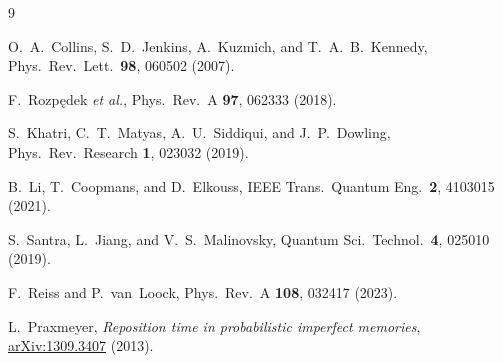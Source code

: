 \documentclass[aps,pra,twocolumn,superscriptaddress,floatfix,nofootinbib]{revtex4-2}
\begin{document}
\begin{thebibliography}{9}

  O.~A.~Collins, S.~D.~Jenkins, A.~Kuzmich, and T.~A.~B.~Kennedy,
  Phys.\ Rev.\ Lett.\ \textbf{98}, 060502 (2007).

  F.~Rozp\k{e}dek \emph{et al.},
  Phys.\ Rev.\ A \textbf{97}, 062333 (2018).

  S.~Khatri, C.~T.~Matyas, A.~U.~Siddiqui, and J.~P.~Dowling,
  Phys.\ Rev.\ Research \textbf{1}, 023032 (2019).

  B.~Li, T.~Coopmans, and D.~Elkouss,
  IEEE Trans.\ Quantum Eng.\ \textbf{2}, 4103015 (2021).

  S.~Santra, L.~Jiang, and V.~S.~Malinovsky,
  Quantum Sci.\ Technol.\ \textbf{4}, 025010 (2019).

  F.~Reiss and P.~van~Loock,
  Phys.\ Rev.\ A \textbf{108}, 032417 (2023).

  L.~Praxmeyer,
  \emph{Reposition time in probabilistic imperfect memories},
  \href{https://arxiv.org/abs/1309.3407}{arXiv:1309.3407} (2013).

\end{thebibliography}
\end{document}
